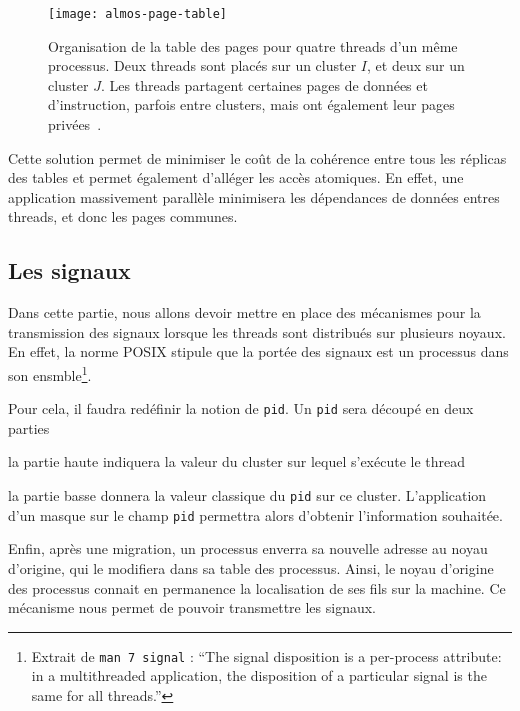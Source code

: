       \begin{figure}[ht]
        \centering
        \texttt{[image: almos-page-table]}
        \caption{Organisation de la table des pages pour quatre threads d'un
          même processus. Deux threads sont placés sur un cluster $I$, et deux
          sur un cluster $J$. Les threads partagent certaines pages de données
          et d'instruction, parfois entre clusters, mais ont également leur
          pages privées~\citep{almaless2014universite}.}
        \label{fig:almos-page-table}
      \end{figure}

      Cette solution permet de minimiser le coût de la cohérence entre tous les
      réplicas des tables et permet également d'alléger les accès atomiques. En
      effet, une application massivement parallèle minimisera les dépendances de
      données entres threads, et donc les pages communes.


    \subsection{Les signaux}

      Dans cette partie, nous allons devoir mettre en place des mécanismes pour
      la transmission des signaux lorsque les threads sont distribués sur
      plusieurs noyaux. En effet, la norme POSIX stipule que la portée des
      signaux est un processus dans son ensmble\footnote{Extrait de \texttt{man
          7 signal} : ``The signal disposition is a per-process attribute: in a
        multithreaded application, the disposition of a particular signal is the
        same for all threads.''}.

      Pour cela, il faudra redéfinir la notion de \texttt{pid}. Un \texttt{pid}
      sera découpé en deux parties \benumline \item la partie haute indiquera la
      valeur du cluster sur lequel s'exécute le thread \item la partie basse
      donnera la valeur classique du \texttt{pid} sur ce
      cluster\eenumline. L'application d'un masque sur le champ \texttt{pid}
      permettra alors d'obtenir l'information souhaitée.

      Enfin, après une migration, un processus enverra sa nouvelle adresse au
      noyau d'origine, qui le modifiera dans sa table des processus. Ainsi, le
      noyau d'origine des processus connait en permanence la localisation de ses
      fils sur la machine. Ce mécanisme nous permet de pouvoir transmettre les
      signaux.


